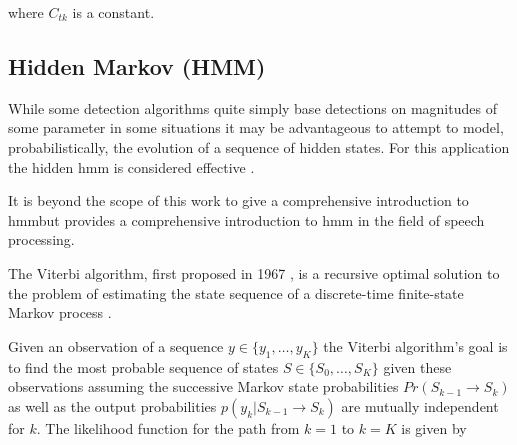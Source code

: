 where $C_{tk}$ is a constant.

\subsection{Hidden Markov \DIFdelbegin {}\DIFdelend \DIFaddbegin {}\DIFaddend (HMM)}
While some detection algorithms quite simply base detections on magnitudes of some parameter \cite{Subramanya2007}\cite{Sugiyama2007}\DIFaddbegin \DIFadd{, }\DIFaddend in some situations it may be advantageous to attempt to model, probabilistically, the evolution of a sequence of hidden states. For this application the hidden \DIFdelbegin {}\DIFdelend \DIFaddbegin \gls{hmm} \DIFaddend is considered effective \cite{Rabiner1989}\cite{Xu2005}.

It is beyond the scope of this work to give a comprehensive introduction to \DIFdelbegin {}\DIFdelend \DIFaddbegin \gls{hmm}\DIFaddend but \cite{Rabiner1989} provides a comprehensive introduction to \DIFdelbegin {}\DIFdelend \DIFaddbegin \gls{hmm} \DIFaddend in the field of speech processing.

The Viterbi algorithm, first proposed in 1967 \cite{Viterbi1967} \DIFaddbegin {}\DIFaddend , is a recursive optimal solution to the problem of estimating the state sequence of a discrete-time finite-state Markov process \cite{Forney1973}. \DIFdelbegin {}\DIFdelend \DIFaddbegin {}\label{corrections:viterbi}
\DIFaddend 

Given an observation of a sequence $y \in \{y_1,\ldots,y_K\}$ the Viterbi algorithm's goal is to find the most probable sequence of states $S \in \{S_0,\ldots,S_K \}$ given these observations assuming the successive Markov state probabilities $Pr(S_{k-1} \rightarrow S_{k})$ as well as the output probabilities $p(y_k | S_{k-1} \rightarrow S_{k})$ are mutually independent for $k$. The likelihood function for the path from $k=1$ to $k=K$ is given by

